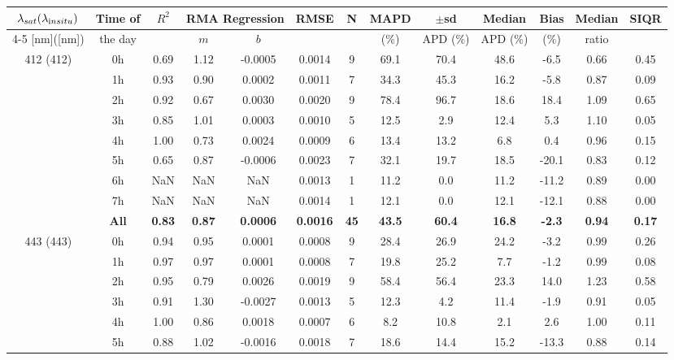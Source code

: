\documentclass[preview]{standalone}
\begin{document}
\tiny

\tiny
\centering
\begin{tabular}{ccccccccccccc} 
 \hline 
$\lambda_{sat} (\lambda_{\text in situ})$ & Time of & $R^2$ & \multicolumn{2}{c}{RMA Regression} & RMSE & N & MAPD & $\pm$sd & Median & Bias & Median & SIQR \\ \cline{4-5}
[nm]([nm])                  &  the day            &         & $m$     & $b$     &             &     & ($\%$)  & APD ($\%$)  & APD ($\%$)  & ($\%$)   & ratio   &         \\ \hline 
\multirow{9}{*}{412 (412)} & 0h & 0.69 & 1.12 & -0.0005 & 0.0014 &  9 & 69.1 & 70.4 & 48.6 & -6.5 & 0.66 & 0.45 \\ 
 & 1h   & 0.93 & 0.90 & 0.0002 & 0.0011 &  7 & 34.3 & 45.3 & 16.2 & -5.8 & 0.87 & 0.09 \\ 
 & 2h   & 0.92 & 0.67 & 0.0030 & 0.0020 &  9 & 78.4 & 96.7 & 18.6 & 18.4 & 1.09 & 0.65 \\ 
 & 3h   & 0.85 & 1.01 & 0.0003 & 0.0010 &  5 & 12.5 & 2.9 & 12.4 & 5.3 & 1.10 & 0.05 \\ 
 & 4h   & 1.00 & 0.73 & 0.0024 & 0.0009 &  6 & 13.4 & 13.2 & 6.8 & 0.4 & 0.96 & 0.15 \\ 
 & 5h   & 0.65 & 0.87 & -0.0006 & 0.0023 &  7 & 32.1 & 19.7 & 18.5 & -20.1 & 0.83 & 0.12 \\ 
 & 6h   & NaN & NaN & NaN & 0.0013 &  1 & 11.2 & 0.0 & 11.2 & -11.2 & 0.89 & 0.00 \\ 
 & 7h   & NaN & NaN & NaN & 0.0014 &  1 & 12.1 & 0.0 & 12.1 & -12.1 & 0.88 & 0.00 \\ \cline{2-13}
 & \textbf{All}  & \textbf{0.83} & \textbf{0.87} & \textbf{0.0006} & \textbf{0.0016} & \textbf{45} & \textbf{43.5} & \textbf{60.4} & \textbf{16.8} & \textbf{-2.3} & \textbf{0.94} & \textbf{0.17} \\ \hline
\multirow{9}{*}{443 (443)} & 0h & 0.94 & 0.95 & 0.0001 & 0.0008 &  9 & 28.4 & 26.9 & 24.2 & -3.2 & 0.99 & 0.26 \\ 
 & 1h   & 0.97 & 0.97 & 0.0001 & 0.0008 &  7 & 19.8 & 25.2 & 7.7 & -1.2 & 0.99 & 0.08 \\ 
 & 2h   & 0.95 & 0.79 & 0.0026 & 0.0019 &  9 & 58.4 & 56.4 & 23.3 & 14.0 & 1.23 & 0.58 \\ 
 & 3h   & 0.91 & 1.30 & -0.0027 & 0.0013 &  5 & 12.3 & 4.2 & 11.4 & -1.9 & 0.91 & 0.05 \\ 
 & 4h   & 1.00 & 0.86 & 0.0018 & 0.0007 &  6 & 8.2 & 10.8 & 2.1 & 2.6 & 1.00 & 0.11 \\ 
 & 5h   & 0.88 & 1.02 & -0.0016 & 0.0018 &  7 & 18.6 & 14.4 & 15.2 & -13.3 & 0.88 & 0.14 \\ 

\end{tabular}
\end{document}
